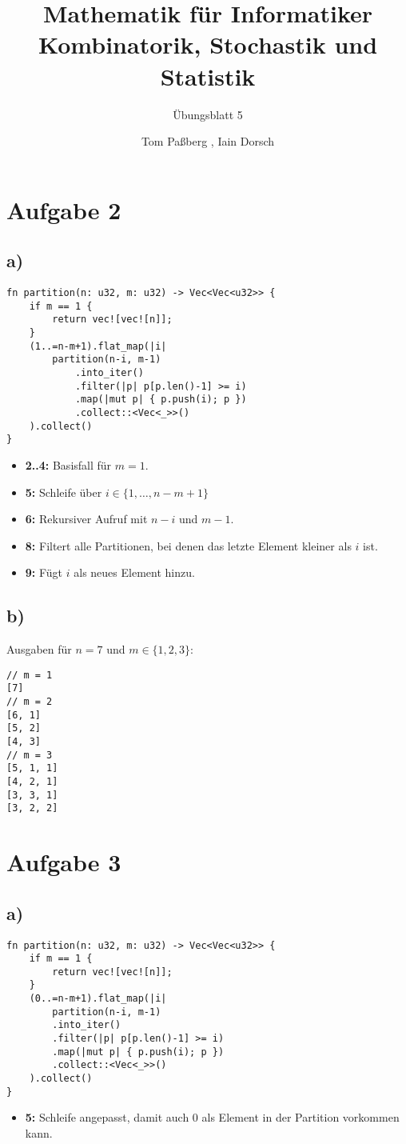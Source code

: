 \documentclass[a4paper]{scrartcl}
\title{Mathematik für Informatiker \\ Kombinatorik, Stochastik und Statistik}
\subtitle{Übungsblatt 5}
\author{Tom Paßberg , Iain Dorsch}
\date{}
\begin{document}
\maketitle

\newpage

\section*{Aufgabe 2}
\subsection*{a)}
\begin{lstlisting}
fn partition(n: u32, m: u32) -> Vec<Vec<u32>> {
	if m == 1 {
		return vec![vec![n]];
	}
	(1..=n-m+1).flat_map(|i| 
		partition(n-i, m-1)
			.into_iter()
			.filter(|p| p[p.len()-1] >= i)
			.map(|mut p| { p.push(i); p })
			.collect::<Vec<_>>()
	).collect()
}
\end{lstlisting}
\begin{itemize}
	\item \textbf{2..4:} Basisfall für $m = 1$.
	\item \textbf{5:} Schleife über $ i \in \{ 1,\ldots, n-m+1\} $
	\item \textbf{6:} Rekursiver Aufruf mit $n-i$ und $m-1$.
	\item \textbf{8:} Filtert alle Partitionen, bei denen das letzte Element kleiner als $i$ ist.
	\item \textbf{9:} Fügt $i$ als neues Element hinzu.
\end{itemize}
\subsection*{b)}
Ausgaben für $n = 7$ und $m \in \{1,2,3\}$:

\begin{lstlisting}
// m = 1
[7]
// m = 2
[6, 1]
[5, 2]
[4, 3]
// m = 3
[5, 1, 1]
[4, 2, 1]
[3, 3, 1]
[3, 2, 2]
\end{lstlisting}

\newpage
\section*{Aufgabe 3}
\subsection*{a)}
\begin{lstlisting}
fn partition(n: u32, m: u32) -> Vec<Vec<u32>> {
	if m == 1 {
		return vec![vec![n]];
	}
	(0..=n-m+1).flat_map(|i| 
		partition(n-i, m-1)
		.into_iter()
		.filter(|p| p[p.len()-1] >= i)
		.map(|mut p| { p.push(i); p })
		.collect::<Vec<_>>()
	).collect()
}
\end{lstlisting}
\begin{itemize}
	\item \textbf{5:} Schleife angepasst, damit auch $0$ als Element in der Partition vorkommen kann.
\end{itemize}
\end{document}
